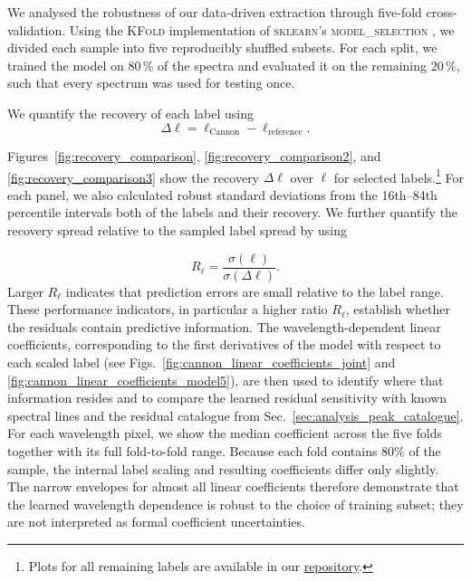 \documentclass[twocolumn,apj,numberedappendix,appendixfloats]{openjournal}
\begin{document}
We analysed the robustness of our data-driven extraction through five-fold cross-validation. Using the \textsc{KFold} implementation of \textsc{sklearn}'s \textsc{model\_selection} \citep{scikit-learn}, we divided each sample into five reproducibly shuffled subsets. For each split, we trained the model on $80\,\mathrm{\%}$ of the spectra and evaluated it on the remaining $20\,\mathrm{\%}$, such that every spectrum was used for testing once.

We quantify the recovery of each label using
\begin{equation}
\Delta \ell
=
\ell_{\mathrm{Cannon}}
-
\ell_{\mathrm{reference}}.
\label{eq:label_residual}
\end{equation}

Figures~\ref{fig:recovery_comparison}, \ref{fig:recovery_comparison2}, and \ref{fig:recovery_comparison3} show the recovery $\Delta \ell$ over $\ell$ for selected labels.\footnote{Plots for all remaining labels are available in our \href{https://github.com/svenbuder/residual_cannon}{repository}.} For each panel, we also calculated robust standard deviations from the 16th--84th percentile intervals both of the labels and their recovery. We further quantify the recovery spread relative to the sampled label spread by using

\begin{equation}
    R_\ell = \frac{\sigma(\ell)}{\sigma(\Delta \ell)}.
\end{equation}
Larger $R_\ell$ indicates that prediction errors are small relative to the label range.
These performance indicators, in particular a higher ratio $R_\ell$, establish whether the residuals contain predictive information. The wavelength-dependent linear coefficients, corresponding to the first derivatives of the model with respect to each scaled label (see Figs.~\ref{fig:cannon_linear_coefficients_joint} and \ref{fig:cannon_linear_coefficients_model5}), are then used to identify where that information resides and to compare the learned residual sensitivity with known spectral lines and the residual catalogue from Sec.~\ref{sec:analysis_peak_catalogue}. For each wavelength pixel, we show the median coefficient across the five folds together with its full fold-to-fold range. Because each fold contains 80\% of the sample, the internal label scaling and resulting coefficients differ only slightly. The narrow envelopes for almost all linear coefficients therefore demonstrate that the learned wavelength dependence is robust to the choice of training subset; they are not interpreted as formal coefficient uncertainties.
\end{document}
